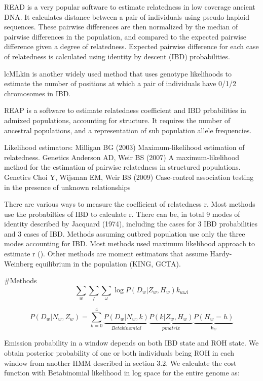 \documentclass[12pt, letterpaper]{article}
\begin{document}
READ is a very popular software to estimate relatedness in low coverage ancient DNA. It calculates distance between a pair of individuals using pseudo haploid sequences. These pairwise differences are then normalized by the median of pairwise differences in the population, and compared to the expected pairwise difference given a degree of relatedness. Expected pairwise difference for each case of relatedness is calculated using identity by descent (IBD) probabilities. 

lcMLkin is another widely used method that uses genotype likelihoods to estimate the number of positions at which a pair of individuals have 0/1/2 chromosomes in IBD.  

REAP is a software to estimate relatedness coefficient and IBD prbabilities in admixed populations, accounting for structure. It requires the number of ancestral populations, and a representation of sub population allele frequencies. 

Likelihood estimators:
Milligan BG (2003) Maximum-likelihood estimation of relatedness. Genetics
Anderson AD, Weir BS (2007) A maximum-likelihood method for the estimation of pairwise relatedness in structured populations. Genetics
Choi Y, Wijsman EM, Weir BS (2009) Case-control association testing in the presence of unknown relationships

There are various ways to measure the coefficient of relatedness r. Most methods use the probabilties of IBD to calculate r. There can be, in total 9 modes of identity described by Jacquard (1974), including the cases for 3 IBD probabilities and 3 cases of IBD. Methods assuming outbred population use only the three modes accounting for IBD. Most methods used maximum likelihood approach to estimate r (). Other methods are moment estimators that assume Hardy-Weinberg equilibrium in the population (KING, GCTA).

#Methods
$$\sum_{w} \sum_{I}\sum_\omega \log P(D_{w}|Z_w, H_w)k_{w\omega i}$$



$$P(D_w | N_w, Z_w) = \sum_{k=0}^4 
\underbrace{P(D_w | N_w, k)}_{Betabinomial}
\underbrace{P(k | Z_w, H_w)}_{p matrix}
\underbrace{P(H_w =h)}_{\mathbf{h}_w}
$$

Emission probability in a window depends on both IBD state and ROH state. We obtain posterior probability of one or both individuals being ROH in each window from another HMM described in section 3.2. We calculate the cost function with Betabinomial likelihood in log space for the entire genome as:
\end{document}
